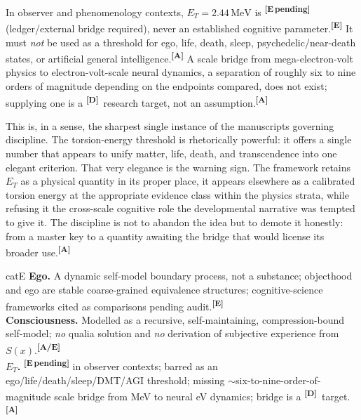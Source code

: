 \documentclass[12pt,a4paper,twoside]{article}
\theoremstyle{plain}
\theoremstyle{definition}
\theoremstyle{remark}
\newcommand{\MeV}{\,\mathrm{MeV}}
\newcommand{\catmark}[1]{\textsuperscript{\textsf{\textbf{[#1]}}}}
\newcommand{\ETorsion}{2.44\MeV} %
\begin{document}
\begin{governancebox}
In observer and phenomenology contexts, $E_T = \ETorsion$ is \catmark{E\,pending} (ledger/external bridge required), never an established cognitive parameter.\catmark{E} It must \emph{not} be used as a threshold for ego, life, death, sleep, psychedelic/near-death states, or artificial general intelligence.\catmark{A} A scale bridge from mega-electron-volt physics to electron-volt-scale neural dynamics, a separation of roughly six to nine orders of magnitude depending on the endpoints compared, does not exist; supplying one is a \catmark{D}\ research target, not an assumption.\catmark{A}
\end{governancebox}

\noindent This is, in a sense, the sharpest single instance of the manuscripts governing discipline. The torsion-energy threshold is rhetorically powerful: it offers a single number that appears to unify matter, life, death, and transcendence into one elegant criterion. That very elegance is the warning sign. The framework retains $E_T$ as a physical quantity in its proper place, it appears elsewhere as a calibrated torsion energy at the appropriate evidence class within the physics strata, while refusing it the cross-scale cognitive role the developmental narrative was tempted to give it. The discipline is not to abandon the idea but to demote it honestly: from a master key to a quantity awaiting the bridge that would license its broader use.\catmark{A}

\begin{evidencebox}{catE}
\textbf{Ego.} A dynamic self-model boundary process, not a substance; objecthood and ego are stable coarse-grained equivalence structures; cognitive-science
frameworks cited as comparisons pending audit.\catmark{E}\\[0.3em]
\textbf{Consciousness.} Modelled as a recursive, self-maintaining, compression-bound self-model; \emph{no} qualia solution and \emph{no} derivation
of subjective experience from $S(x)$.\catmark{A/E}\\[0.3em]
\textbf{$E_T$.} \catmark{E\,pending} in observer contexts; barred as an ego/life/death/sleep/DMT/AGI threshold; missing $\sim$six-to-nine-order-of-magnitude scale bridge from MeV to neural eV dynamics; bridge is a \catmark{D}\ target.\catmark{A}
\end{evidencebox}

\newpage
\end{document}
